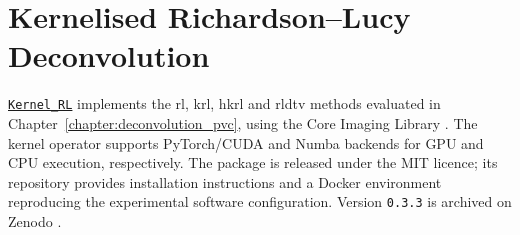 \section[Kernelised Richardson--Lucy deconvolution]{Kernelised Richardson--Lucy Deconvolution}
\label{app:kernel_rl}

\href{https://github.com/samdporter/Kernel_RL}{\texttt{Kernel\_RL}} implements the \gls{rl}, \gls{krl}, \gls{hkrl} and \gls{rldtv} methods evaluated in Chapter~\ref{chapter:deconvolution_pvc}, using the Core Imaging Library \cite{jorgensenCoreImagingLibrary2021}. The kernel operator supports PyTorch/CUDA and Numba backends for GPU and CPU execution, respectively. The package is released under the MIT licence; its repository provides installation instructions and a Docker environment reproducing the experimental software configuration. Version \texttt{0.3.3} is archived on Zenodo \cite{porterCilKrl2026}.

